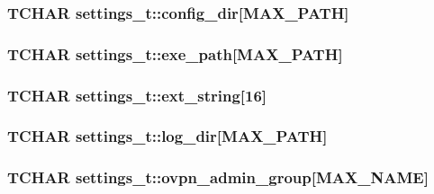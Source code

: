 \subsubsection[{config\+\_\+dir}]{\setlength{\rightskip}{0pt plus 5cm}T\+C\+H\+A\+R settings\+\_\+t\+::config\+\_\+dir\mbox{[}M\+A\+X\+\_\+\+P\+A\+T\+H\mbox{]}}\label{structsettings__t_a7d3f6a2f9c73a9c41fff9bdff69c5d01}
\hypertarget{structsettings__t_a42376d1376edba6dac152e505b5177db}{}
\subsubsection[{exe\+\_\+path}]{\setlength{\rightskip}{0pt plus 5cm}T\+C\+H\+A\+R settings\+\_\+t\+::exe\+\_\+path\mbox{[}M\+A\+X\+\_\+\+P\+A\+T\+H\mbox{]}}\label{structsettings__t_a42376d1376edba6dac152e505b5177db}
\hypertarget{structsettings__t_ab73e9de01c93a6ca31ce2eb79a2cc8ad}{}
\subsubsection[{ext\+\_\+string}]{\setlength{\rightskip}{0pt plus 5cm}T\+C\+H\+A\+R settings\+\_\+t\+::ext\+\_\+string\mbox{[}16\mbox{]}}\label{structsettings__t_ab73e9de01c93a6ca31ce2eb79a2cc8ad}
\hypertarget{structsettings__t_a088b83e62804f0717fcb0d67352b5c71}{}
\subsubsection[{log\+\_\+dir}]{\setlength{\rightskip}{0pt plus 5cm}T\+C\+H\+A\+R settings\+\_\+t\+::log\+\_\+dir\mbox{[}M\+A\+X\+\_\+\+P\+A\+T\+H\mbox{]}}\label{structsettings__t_a088b83e62804f0717fcb0d67352b5c71}
\hypertarget{structsettings__t_a73cbc7e839af82bb046b2e0119873512}{}
\subsubsection[{ovpn\+\_\+admin\+\_\+group}]{\setlength{\rightskip}{0pt plus 5cm}T\+C\+H\+A\+R settings\+\_\+t\+::ovpn\+\_\+admin\+\_\+group\mbox{[}{\bf M\+A\+X\+\_\+\+N\+A\+M\+E}\mbox{]}}\label{structsettings__t_a73cbc7e839af82bb046b2e0119873512}
\hypertarget{structsettings__t_ab0aa05b71ae5c8d3ed0b123dd1b830f3}{}
